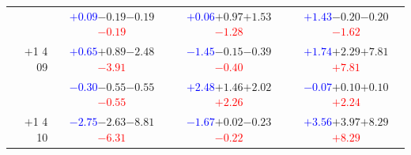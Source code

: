 \documentclass[compress]{beamer}
\begin{document}
\begin{frame}
\begin{tabular}{r | c | c | c}
          & \textcolor{blue}{$+0.09$}\hspace{0.1 cm}$-0.19$\hspace{0.1 cm}$-0.19$\hspace{0.1 cm}\textcolor{red}{$-0.19$} & \textcolor{blue}{$+0.06$}\hspace{0.1 cm}$+0.97$\hspace{0.1 cm}$+1.53$\hspace{0.1 cm}\textcolor{red}{$-1.28$} & \textcolor{blue}{$+1.43$}\hspace{0.1 cm}$-0.20$\hspace{0.1 cm}$-0.20$\hspace{0.1 cm}\textcolor{red}{$-1.62$} \\
$+$1 4 09 & \textcolor{blue}{$+0.65$}\hspace{0.1 cm}$+0.89$\hspace{0.1 cm}$-2.48$\hspace{0.1 cm}\textcolor{red}{$-3.91$} & \textcolor{blue}{$-1.45$}\hspace{0.1 cm}$-0.15$\hspace{0.1 cm}$-0.39$\hspace{0.1 cm}\textcolor{red}{$-0.40$} & \textcolor{blue}{$+1.74$}\hspace{0.1 cm}$+2.29$\hspace{0.1 cm}$+7.81$\hspace{0.1 cm}\textcolor{red}{$+7.81$} \\
          & \textcolor{blue}{$-0.30$}\hspace{0.1 cm}$-0.55$\hspace{0.1 cm}$-0.55$\hspace{0.1 cm}\textcolor{red}{$-0.55$} & \textcolor{blue}{$+2.48$}\hspace{0.1 cm}$+1.46$\hspace{0.1 cm}$+2.02$\hspace{0.1 cm}\textcolor{red}{$+2.26$} & \textcolor{blue}{$-0.07$}\hspace{0.1 cm}$+0.10$\hspace{0.1 cm}$+0.10$\hspace{0.1 cm}\textcolor{red}{$+2.24$} \\
$+$1 4 10 & \textcolor{blue}{$-2.75$}\hspace{0.1 cm}$-2.63$\hspace{0.1 cm}$-8.81$\hspace{0.1 cm}\textcolor{red}{$-6.31$} & \textcolor{blue}{$-1.67$}\hspace{0.1 cm}$+0.02$\hspace{0.1 cm}$-0.23$\hspace{0.1 cm}\textcolor{red}{$-0.22$} & \textcolor{blue}{$+3.56$}\hspace{0.1 cm}$+3.97$\hspace{0.1 cm}$+8.29$\hspace{0.1 cm}\textcolor{red}{$+8.29$} \\

\end{tabular}
\end{frame}
\end{document}
